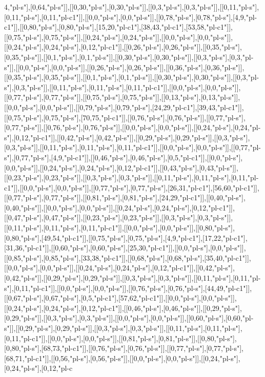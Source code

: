 4,"pl-s"],[0,64,"pl-s"]],[[0,30,"pl-s"],[0,30,"pl-s"]],[[0,3,"pl-s"],[0,3,"pl-s"]],[[0,11,"pl-s"],[0,11,"pl-s"],[0,11,"pl-c1"]],[[0,0,"pl-s"],[0,0,"pl-s"]],[[0,78,"pl-s"],[0,78,"pl-s"],[4,9,"pl-c1"]],[[0,80,"pl-s"],[0,80,"pl-s"],[15,20,"pl-c1"],[38,43,"pl-c1"],[53,58,"pl-c1"]],[[0,75,"pl-s"],[0,75,"pl-s"]],[[0,24,"pl-s"],[0,24,"pl-s"]],[[0,0,"pl-s"],[0,0,"pl-s"]],[[0,24,"pl-s"],[0,24,"pl-s"],[0,12,"pl-c1"]],[[0,26,"pl-s"],[0,26,"pl-s"]],[[0,35,"pl-s"],[0,35,"pl-s"]],[[0,1,"pl-s"],[0,1,"pl-s"]],[[0,30,"pl-s"],[0,30,"pl-s"]],[[0,3,"pl-s"],[0,3,"pl-s"]],[[0,0,"pl-s"],[0,0,"pl-s"]],[[0,26,"pl-s"],[0,26,"pl-s"]],[[0,36,"pl-s"],[0,36,"pl-s"]],[[0,35,"pl-s"],[0,35,"pl-s"]],[[0,1,"pl-s"],[0,1,"pl-s"]],[[0,30,"pl-s"],[0,30,"pl-s"]],[[0,3,"pl-s"],[0,3,"pl-s"]],[[0,11,"pl-s"],[0,11,"pl-s"],[0,11,"pl-c1"]],[[0,0,"pl-s"],[0,0,"pl-s"]],[[0,77,"pl-s"],[0,77,"pl-s"]],[[0,75,"pl-s"],[0,75,"pl-s"]],[[0,13,"pl-s"],[0,13,"pl-s"]],[[0,0,"pl-s"],[0,0,"pl-s"]],[[0,79,"pl-s"],[0,79,"pl-s"],[24,29,"pl-c1"],[39,43,"pl-c1"]],[[0,75,"pl-s"],[0,75,"pl-s"],[70,75,"pl-c1"]],[[0,76,"pl-s"],[0,76,"pl-s"]],[[0,77,"pl-s"],[0,77,"pl-s"]],[[0,76,"pl-s"],[0,76,"pl-s"]],[[0,0,"pl-s"],[0,0,"pl-s"]],[[0,24,"pl-s"],[0,24,"pl-s"],[0,12,"pl-c1"]],[[0,42,"pl-s"],[0,42,"pl-s"]],[[0,29,"pl-s"],[0,29,"pl-s"]],[[0,3,"pl-s"],[0,3,"pl-s"]],[[0,11,"pl-s"],[0,11,"pl-s"],[0,11,"pl-c1"]],[[0,0,"pl-s"],[0,0,"pl-s"]],[[0,77,"pl-s"],[0,77,"pl-s"],[4,9,"pl-c1"]],[[0,46,"pl-s"],[0,46,"pl-s"],[0,5,"pl-c1"]],[[0,0,"pl-s"],[0,0,"pl-s"]],[[0,24,"pl-s"],[0,24,"pl-s"],[0,12,"pl-c1"]],[[0,43,"pl-s"],[0,43,"pl-s"]],[[0,23,"pl-s"],[0,23,"pl-s"]],[[0,3,"pl-s"],[0,3,"pl-s"]],[[0,11,"pl-s"],[0,11,"pl-s"],[0,11,"pl-c1"]],[[0,0,"pl-s"],[0,0,"pl-s"]],[[0,77,"pl-s"],[0,77,"pl-s"],[26,31,"pl-c1"],[56,60,"pl-c1"]],[[0,77,"pl-s"],[0,77,"pl-s"]],[[0,81,"pl-s"],[0,81,"pl-s"],[24,29,"pl-c1"]],[[0,40,"pl-s"],[0,40,"pl-s"]],[[0,0,"pl-s"],[0,0,"pl-s"]],[[0,24,"pl-s"],[0,24,"pl-s"],[0,12,"pl-c1"]],[[0,47,"pl-s"],[0,47,"pl-s"]],[[0,23,"pl-s"],[0,23,"pl-s"]],[[0,3,"pl-s"],[0,3,"pl-s"]],[[0,11,"pl-s"],[0,11,"pl-s"],[0,11,"pl-c1"]],[[0,0,"pl-s"],[0,0,"pl-s"]],[[0,80,"pl-s"],[0,80,"pl-s"],[49,54,"pl-c1"]],[[0,75,"pl-s"],[0,75,"pl-s"],[4,9,"pl-c1"],[17,22,"pl-c1"],[31,36,"pl-c1"]],[[0,60,"pl-s"],[0,60,"pl-s"],[25,30,"pl-c1"]],[[0,0,"pl-s"],[0,0,"pl-s"]],[[0,85,"pl-s"],[0,85,"pl-s"],[33,38,"pl-c1"]],[[0,68,"pl-s"],[0,68,"pl-s"],[35,40,"pl-c1"]],[[0,0,"pl-s"],[0,0,"pl-s"]],[[0,24,"pl-s"],[0,24,"pl-s"],[0,12,"pl-c1"]],[[0,42,"pl-s"],[0,42,"pl-s"]],[[0,29,"pl-s"],[0,29,"pl-s"]],[[0,3,"pl-s"],[0,3,"pl-s"]],[[0,11,"pl-s"],[0,11,"pl-s"],[0,11,"pl-c1"]],[[0,0,"pl-s"],[0,0,"pl-s"]],[[0,76,"pl-s"],[0,76,"pl-s"],[44,49,"pl-c1"]],[[0,67,"pl-s"],[0,67,"pl-s"],[0,5,"pl-c1"],[57,62,"pl-c1"]],[[0,0,"pl-s"],[0,0,"pl-s"]],[[0,24,"pl-s"],[0,24,"pl-s"],[0,12,"pl-c1"]],[[0,46,"pl-s"],[0,46,"pl-s"]],[[0,29,"pl-s"],[0,29,"pl-s"]],[[0,3,"pl-s"],[0,3,"pl-s"]],[[0,0,"pl-s"],[0,0,"pl-s"]],[[0,60,"pl-s"],[0,60,"pl-s"]],[[0,29,"pl-s"],[0,29,"pl-s"]],[[0,3,"pl-s"],[0,3,"pl-s"]],[[0,11,"pl-s"],[0,11,"pl-s"],[0,11,"pl-c1"]],[[0,0,"pl-s"],[0,0,"pl-s"]],[[0,81,"pl-s"],[0,81,"pl-s"]],[[0,80,"pl-s"],[0,80,"pl-s"],[68,73,"pl-c1"]],[[0,76,"pl-s"],[0,76,"pl-s"]],[[0,77,"pl-s"],[0,77,"pl-s"],[68,71,"pl-c1"]],[[0,56,"pl-s"],[0,56,"pl-s"]],[[0,0,"pl-s"],[0,0,"pl-s"]],[[0,24,"pl-s"],[0,24,"pl-s"],[0,12,"pl-c